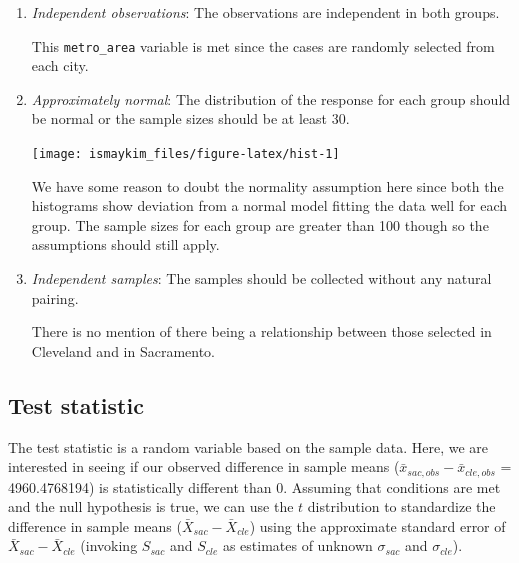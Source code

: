 \documentclass[]{tufte-book}
\newenvironment{Shaded}{\begin{snugshade}}{\end{snugshade}}
\newcommand{\KeywordTok}[1]{\textcolor[rgb]{0.13,0.29,0.53}{\textbf{{#1}}}}
\newcommand{\DataTypeTok}[1]{\textcolor[rgb]{0.13,0.29,0.53}{{#1}}}
\newcommand{\DecValTok}[1]{\textcolor[rgb]{0.00,0.00,0.81}{{#1}}}
\newcommand{\StringTok}[1]{\textcolor[rgb]{0.31,0.60,0.02}{{#1}}}
\newcommand{\NormalTok}[1]{{#1}}
\begin{document}
\begin{enumerate}
\def\labelenumi{\arabic{enumi}.}
\item
  \emph{Independent observations}: The observations are independent in
  both groups.

  This \texttt{metro\_area} variable is met since the cases are randomly
  selected from each city.
\item
  \emph{Approximately normal}: The distribution of the response for each
  group should be normal or the sample sizes should be at least 30.

\begin{Shaded}
\end{Shaded}

  \begin{center}\texttt{[image: ismaykim\_files/figure-latex/hist-1]} \end{center}

  We have some reason to doubt the normality assumption here since both
  the histograms show deviation from a normal model fitting the data
  well for each group. The sample sizes for each group are greater than
  100 though so the assumptions should still apply.
\item
  \emph{Independent samples}: The samples should be collected without
  any natural pairing.

  There is no mention of there being a relationship between those
  selected in Cleveland and in Sacramento.
\end{enumerate}

\subsection{Test statistic}\label{test-statistic-3}

The test statistic is a random variable based on the sample data. Here,
we are interested in seeing if our observed difference in sample means
(\(\bar{x}_{sac, obs} - \bar{x}_{cle, obs}\) = 4960.4768194) is
statistically different than 0. Assuming that conditions are met and the
null hypothesis is true, we can use the \(t\) distribution to
standardize the difference in sample means
(\(\bar{X}_{sac} - \bar{X}_{cle}\)) using the approximate standard error
of \(\bar{X}_{sac} - \bar{X}_{cle}\) (invoking \(S_{sac}\) and
\(S_{cle}\) as estimates of unknown \(\sigma_{sac}\) and
\(\sigma_{cle}\)).
\end{document}
